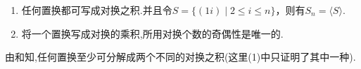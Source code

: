 \documentclass[../../main.tex]{subfiles}%
\begin{document}
\begin{corollary}\label{theorem:抽象代数--置换必可写成对换之积}
\begin{enumerate}[(1)]
\item 任何置换都可写成对换之积.并且令$S = \{(1i) \mid 2 \leqslant i \leqslant n\}$，则有$S_n = \langle S \rangle$.

\item 将一个置换写成对换的乘积,所用对换个数的奇偶性是唯一的.
\end{enumerate}
\end{corollary}
\begin{remark}
由和知,任何置换至少可分解成两个不同的对换之积(这里(1)中只证明了其中一种).
\end{remark}
\end{document}
